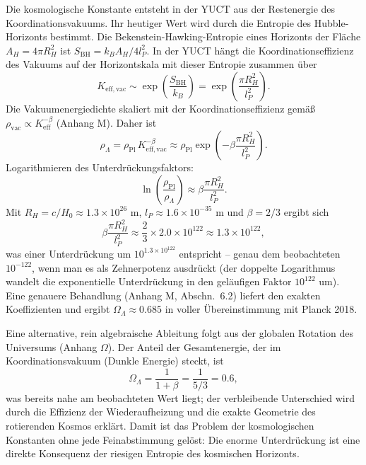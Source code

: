 \documentclass[11pt,a4paper]{article}
\theoremstyle{remark}
\begin{document}
	Die kosmologische Konstante entsteht in der YUCT aus der Restenergie des Koordinationsvakuums. Ihr heutiger Wert wird durch die Entropie des Hubble-Horizonts bestimmt. Die Bekenstein-Hawking-Entropie eines Horizonts der Fläche \(A_H = 4\pi R_H^2\) ist \(S_{\mathrm{BH}} = k_B A_H / 4l_P^2\). In der YUCT hängt die Koordinationseffizienz des Vakuums auf der Horizontskala mit dieser Entropie zusammen über
	\begin{equation}
		K_{\mathrm{eff, vac}} \sim \exp\left( \frac{S_{\mathrm{BH}}}{k_B} \right) = \exp\left( \frac{\pi R_H^2}{l_P^2} \right).
	\end{equation}
	Die Vakuumenergiedichte skaliert mit der Koordinationseffizienz gemäß \(\rho_{\mathrm{vac}} \propto K_{\mathrm{eff}}^{-\beta}\) (Anhang M). Daher ist
	\begin{equation}
		\rho_\Lambda = \rho_{\mathrm{Pl}} \, K_{\mathrm{eff, vac}}^{-\beta} \approx \rho_{\mathrm{Pl}} \exp\left( -\beta \frac{\pi R_H^2}{l_P^2} \right).
		\label{eq:lambda-suppression}
	\end{equation}
	Logarithmieren des Unterdrückungsfaktors:
	\begin{equation}
		\ln\left( \frac{\rho_{\mathrm{Pl}}}{\rho_\Lambda} \right) \approx \beta \frac{\pi R_H^2}{l_P^2}.
	\end{equation}
	Mit \(R_H = c / H_0 \approx 1.3 \times 10^{26}\) m, \(l_P \approx 1.6 \times 10^{-35}\) m und \(\beta = 2/3\) ergibt sich
	\begin{equation}
		\beta \frac{\pi R_H^2}{l_P^2} \approx \frac{2}{3} \times 2.0 \times 10^{122} \approx 1.3 \times 10^{122},
	\end{equation}
	was einer Unterdrückung um \(10^{1.3 \times 10^{122}}\) entspricht – genau dem beobachteten \(10^{-122}\), wenn man es als Zehnerpotenz ausdrückt (der doppelte Logarithmus wandelt die exponentielle Unterdrückung in den geläufigen Faktor \(10^{122}\) um). Eine genauere Behandlung (Anhang M, Abschn.~6.2) liefert den exakten Koeffizienten und ergibt \(\Omega_\Lambda \approx 0.685\) in voller Übereinstimmung mit Planck 2018.
	
	Eine alternative, rein algebraische Ableitung folgt aus der globalen Rotation des Universums (Anhang $\Omega$). Der Anteil der Gesamtenergie, der im Koordinationsvakuum (Dunkle Energie) steckt, ist
	\begin{equation}
		\Omega_\Lambda = \frac{1}{1+\beta} = \frac{1}{5/3} = 0.6,
	\end{equation}
	was bereits nahe am beobachteten Wert liegt; der verbleibende Unterschied wird durch die Effizienz der Wiederaufheizung und die exakte Geometrie des rotierenden Kosmos erklärt. Damit ist das Problem der kosmologischen Konstanten ohne jede Feinabstimmung gelöst: Die enorme Unterdrückung ist eine direkte Konsequenz der riesigen Entropie des kosmischen Horizonts.
	
\end{document}
